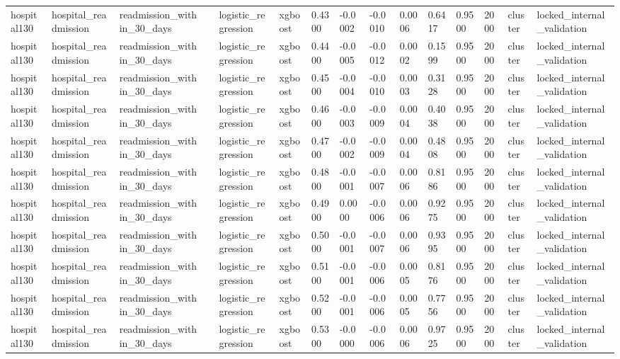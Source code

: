 \begin{tabular}{lllllllllllllll}
hospital130 & hospital\_readmission & readmission\_within\_30\_days &  & logistic\_regression & xgboost & 0.4300 & -0.0002 & -0.0010 & 0.0006 & 0.6417 & 0.9500 & 2000 & cluster & locked\_internal\_validation \\
hospital130 & hospital\_readmission & readmission\_within\_30\_days &  & logistic\_regression & xgboost & 0.4400 & -0.0005 & -0.0012 & 0.0002 & 0.1599 & 0.9500 & 2000 & cluster & locked\_internal\_validation \\
hospital130 & hospital\_readmission & readmission\_within\_30\_days &  & logistic\_regression & xgboost & 0.4500 & -0.0004 & -0.0010 & 0.0003 & 0.3128 & 0.9500 & 2000 & cluster & locked\_internal\_validation \\
hospital130 & hospital\_readmission & readmission\_within\_30\_days &  & logistic\_regression & xgboost & 0.4600 & -0.0003 & -0.0009 & 0.0004 & 0.4038 & 0.9500 & 2000 & cluster & locked\_internal\_validation \\
hospital130 & hospital\_readmission & readmission\_within\_30\_days &  & logistic\_regression & xgboost & 0.4700 & -0.0002 & -0.0009 & 0.0004 & 0.4808 & 0.9500 & 2000 & cluster & locked\_internal\_validation \\
hospital130 & hospital\_readmission & readmission\_within\_30\_days &  & logistic\_regression & xgboost & 0.4800 & -0.0001 & -0.0007 & 0.0006 & 0.8186 & 0.9500 & 2000 & cluster & locked\_internal\_validation \\
hospital130 & hospital\_readmission & readmission\_within\_30\_days &  & logistic\_regression & xgboost & 0.4900 & 0.0000 & -0.0006 & 0.0006 & 0.9275 & 0.9500 & 2000 & cluster & locked\_internal\_validation \\
hospital130 & hospital\_readmission & readmission\_within\_30\_days &  & logistic\_regression & xgboost & 0.5000 & -0.0001 & -0.0007 & 0.0006 & 0.9395 & 0.9500 & 2000 & cluster & locked\_internal\_validation \\
hospital130 & hospital\_readmission & readmission\_within\_30\_days &  & logistic\_regression & xgboost & 0.5100 & -0.0001 & -0.0006 & 0.0005 & 0.8176 & 0.9500 & 2000 & cluster & locked\_internal\_validation \\
hospital130 & hospital\_readmission & readmission\_within\_30\_days &  & logistic\_regression & xgboost & 0.5200 & -0.0001 & -0.0006 & 0.0005 & 0.7756 & 0.9500 & 2000 & cluster & locked\_internal\_validation \\
hospital130 & hospital\_readmission & readmission\_within\_30\_days &  & logistic\_regression & xgboost & 0.5300 & -0.0000 & -0.0006 & 0.0006 & 0.9725 & 0.9500 & 2000 & cluster & locked\_internal\_validation \\

\end{tabular}
